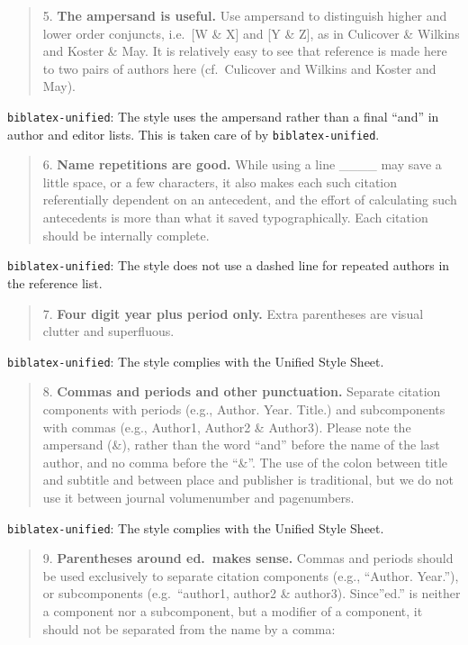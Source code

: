 \documentclass[
]{article}
\begin{document}
\begin{quote}
5. \textbf{The ampersand is useful.} Use ampersand to distinguish higher
and lower order conjuncts, i.e.~{[}W \& X{]} and {[}Y \& Z{]}, as in
Culicover \& Wilkins and Koster \& May. It is relatively easy to see
that reference is made here to two pairs of authors here (cf.~Culicover
and Wilkins and Koster and May).
\end{quote}

\texttt{biblatex-unified}: The style uses the ampersand rather than a
final ``and'' in author and editor lists. This is taken care of by
\texttt{biblatex-unified}.

\begin{quote}
6. \textbf{Name repetitions are good.} While using a line \_\_\_\_ may
save a little space, or a few characters, it also makes each such
citation referentially dependent on an antecedent, and the effort of
calculating such antecedents is more than what it saved typographically.
Each citation should be internally complete.
\end{quote}

\texttt{biblatex-unified}: The style does not use a dashed line for
repeated authors in the reference list.

\begin{quote}
7. \textbf{Four digit year plus period only.} Extra parentheses are
visual clutter and superfluous.
\end{quote}

\texttt{biblatex-unified}: The style complies with the Unified Style
Sheet.

\begin{quote}
8. \textbf{Commas and periods and other punctuation.} Separate citation
components with periods (e.g., Author. Year. Title.) and subcomponents
with commas (e.g., Author1, Author2 \& Author3). Please note the
ampersand (\&), rather than the word ``and'' before the name of the last
author, and no comma before the ``\&''. The use of the colon between
title and subtitle and between place and publisher is traditional, but
we do not use it between journal volumenumber and pagenumbers.
\end{quote}

\texttt{biblatex-unified}: The style complies with the Unified Style
Sheet.

\begin{quote}
9. \textbf{Parentheses around ed.~makes sense.} Commas and periods
should be used exclusively to separate citation components (e.g.,
``Author. Year.''), or subcomponents (e.g.~``author1, author2 \&
author3). Since''ed.'' is neither a component nor a subcomponent, but a
modifier of a component, it should not be separated from the name by a
comma:
\end{quote}
\end{document}

